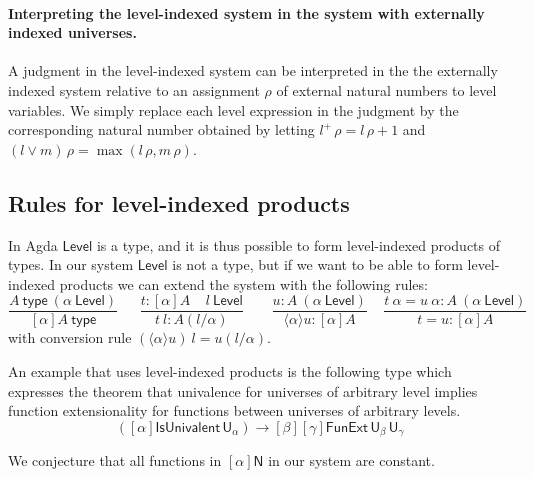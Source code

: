 \documentclass[11pt,a4paper]{article}
\newcommand{\lam}[2]{{\langle}#1{\rangle}#2}
\def\NN{\mathsf{N}}
\def\UU{\mathsf{U}}
\def\Level{\mathsf{Level}}
\newcommand{\type}{\mathsf{type}}
\begin{document}
\paragraph{Interpreting the level-indexed system in the system with externally indexed universes.}

A judgment in the level-indexed system can be interpreted in the the externally indexed system relative to an assignment $\rho$ of external natural numbers to level variables. We simply replace each level expression in the judgment by the corresponding natural number obtained by letting $l^+\,\rho = l\,\rho+1$ and $(l \vee m)\,\rho = \max(l\,\rho,m\,\rho)$.

\subsection*{Rules for level-indexed products}

In Agda $\Level$ is a type, and it is thus possible to form level-indexed products of types. In our system $\Level$ is not a type, but if we want to be able to form level-indexed products we can extend the system with the following rules:
$$
\frac{A~\type~(\alpha~\Level)}{[\alpha]A~\type}~~~~~~~
\frac{t:[\alpha]A~~~~~l~\Level}
     {t~l:A(l/\alpha)}~~~~~~~~~
\frac{u:A~(\alpha~\Level)}{\lam{\alpha}{u}: [\alpha]A}~~~~~
\frac{t~\alpha = u~\alpha:A~(\alpha~\Level)}{t = u:[\alpha]A}
$$
with conversion rule $(\lam{\alpha}{u})~l = u(l/\alpha)$.

An example that uses level-indexed products is the following type which  expresses the theorem that univalence for universes of arbitrary level implies function extensionality for functions between universes of arbitrary levels.
$$
([\alpha]\mathsf{IsUnivalent}\, \UU_\alpha)
\to [\beta][\gamma] \mathsf{FunExt}\, \UU_\beta\, \UU_\gamma
$$   
               
We conjecture that all functions in $[\alpha]\NN$ in our system
are constant. 

\end{document}
